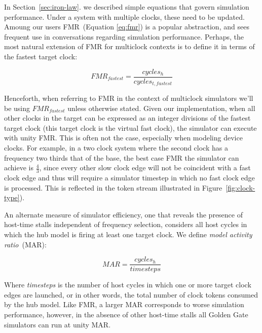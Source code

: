 In Section~\ref{sec:iron-law}. we described simple equations that govern
simulation performance.  Under a system with multiple clocks, these need to be
updated. Amoung our users FMR~(Equation \ref{eq:fmr}) is a popular abstraction, and sees frequent use
in conversations regarding simulation performance. Perhaps, the most natural
extension of FMR for multiclock contexts is to define it in terms of the fastest
target clock:

\begin{equation}
    FMR_{fastest} = \frac{cycles_{h}}{cycles_{t,fastest}}
\end{equation}\label{eq:fmr-fastest}

Henceforth, when referring to FMR in the context of multiclock simulators we'll
be using $FMR_{fastest}$ unless otherwise stated.  Given our implementation,
when all other clocks in the target can be expressed as an integer divisions of
the fastest target clock (this target clock is the virtual fast clock), the
simulator can execute with unity FMR. This is often not the case, especially
when modeling device clocks. For example, in a two clock system where the
second clock has a frequency two thirds that of the base, the best case FMR the
simulator can achieve is $\frac{4}{3}$, since every other slow clock edge will not be
coincident with a fast clock edge and thus will require a simulator timestep in which no fast clock edge is processed.
This is reflected in the token stream illustrated in Figure~\ref{fig:clock-type}).

An alternate measure of simulator efficiency, one that reveals the presence of
host-time stalls independent of frequency selection, considers all host cycles in
which the hub model is firing at least one target clock. We define \emph{model
activity ratio}~(MAR):

\begin{equation}
    MAR = \frac{cycles_h}{timesteps}
\end{equation}\label{eq:mar}

Where \emph{timesteps} is the number of host cycles in which one or more target
clock edges are launched, or in other words, the total number of clock tokens
consumed by the hub model. Like FMR, a larger MAR corresponds to worse
simulation performance, however, in the absence of other host-time stalls all
Golden Gate simulators can run at unity MAR.


